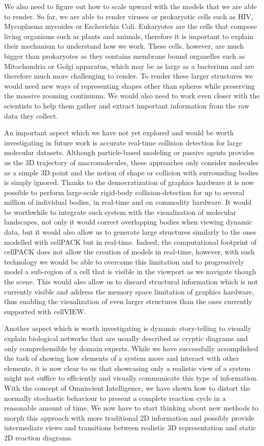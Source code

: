 We also need to figure out how to scale upward with the models that we are able to render.
So far, we are able to render viruses or prokaryotic cells such as HIV, Mycoplasma mycoides or Escherichia Coli. 
Eukaryotes are the cells that compose living organisms such as plants and animals, therefore it is important to explain their mechanism to understand how we work.
These cells, however, are much bigger than prokaryotes as they contains membrane bound organelles such as Mitochondria or Golgi apparatus, which may be as large as a bacterium and are therefore much more challenging to render.
To render these larger structures we would need new ways of representing shapes other than spheres while preserving the massive zooming continuum.
We would also need to work even closer with the scientists to help them gather and extract important information from the raw data they collect.

An important aspect which we have not yet explored and would be worth investigating in future work is accurate real-time collision detection for large molecular datasets.
Although particle-based modeling or passive agents provides us the 3D trajectory of macromolecules, these approaches only consider molecules as a simple 3D point and the notion of shape or collision with surrounding bodies is simply ignored.
Thanks to the democratization of graphics hardware it is now possible to perform large-scale rigid-body collision-detection for up to several million of individual bodies, in real-time and on commodity hardware.
It would be worthwhile to integrate such system with the visualization of molecular landscapes, not only it would correct overlapping bodies when viewing dynamic data, but it would also allow us to generate large structures similarly to the ones modelled with cellPACK but in real-time.
Indeed, the computational footprint of cellPACK does not allow the creation of models in real-time, however, with such technology we would be able to overcome this limitation and to progressively model a sub-region of a cell that is visible in the viewport as we navigate though the scene.
This would also allow us to discard structural information which is not currently visible and address the memory space limitation of graphics hardware, thus enabling the visualization of even larger structures than the ones currently supported with cellVIEW.

Another aspect which is worth investigating is dynamic story-telling to visually explain biological networks that are usually described as cryptic diagrams and only comprehensible by domain experts.
While we have successfully accomplished the task of showing how elements of a system move and interact with other elements, it is now clear to us that showcasing only a realistic view of a system might not suffice to efficiently and visually communicate this type of information.
With the concept of Omniscient Intelligence, we have shown how to distort the normally stochastic behaviour to present a complete reaction cycle in a reasonable amount of time.
We now have to start thinking about new methods to morph this approach with more traditional 2D information and possibly provide intermediate views and transitions between realistic 3D representation and static 2D reaction diagrams.


